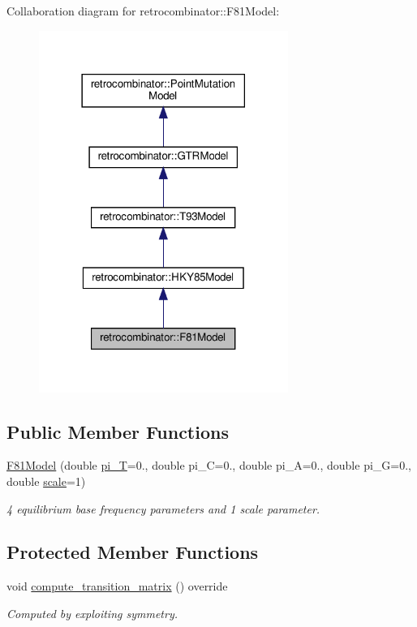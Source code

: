 Collaboration diagram for retrocombinator\+:\+:F81\+Model\+:\nopagebreak
\begin{figure}[H]
\begin{center}
\leavevmode
\includegraphics[width=230pt]{classretrocombinator_1_1F81Model__coll__graph}
\end{center}
\end{figure}
\subsection*{Public Member Functions}
\begin{DoxyCompactItemize}
\item 
\hyperlink{classretrocombinator_1_1F81Model_a80c3357497cdc6b91ff4c408750b47bb}{F81\+Model} (double \hyperlink{classretrocombinator_1_1GTRModel_ab002dbc62f8e8fbfc94558dd94166bd8}{pi\+\_\+T}=0., double pi\+\_\+C=0., double pi\+\_\+A=0., double pi\+\_\+G=0., double \hyperlink{classretrocombinator_1_1PointMutationModel_a3258dfbdae0f2614cdc66f13ae028b46}{scale}=1)
\begin{DoxyCompactList}\small\item\em 4 equilibrium base frequency parameters and 1 scale parameter. \end{DoxyCompactList}\end{DoxyCompactItemize}
\subsection*{Protected Member Functions}
\begin{DoxyCompactItemize}
\item 
\mbox{\label{classretrocombinator_1_1F81Model_a5bb9c63e55c4f8f7b9573281ff6ee610}} 
void \hyperlink{classretrocombinator_1_1F81Model_a5bb9c63e55c4f8f7b9573281ff6ee610}{compute\+\_\+transition\+\_\+matrix} () override
\begin{DoxyCompactList}\small\item\em Computed by exploiting symmetry. \end{DoxyCompactList}\end{DoxyCompactItemize}
